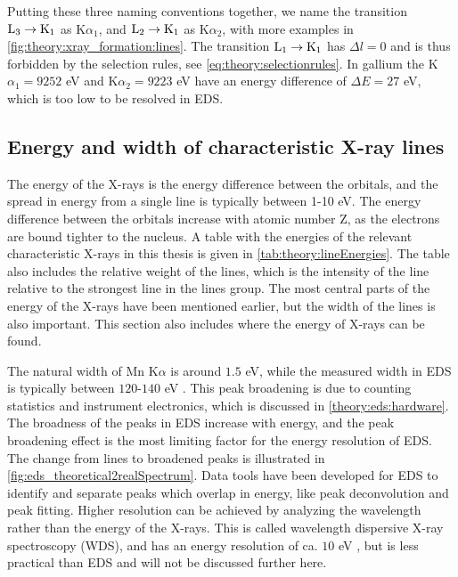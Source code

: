 Putting these three naming conventions together, we name the transition $\textnormal{L}_3 \rightarrow \textnormal{K}_1$ as K$\alpha_1$, and $\textnormal{L}_2 \rightarrow \textnormal{K}_1$ as K$\alpha_2$, with more examples in \cref{fig:theory:xray_formation:lines}.
The transition $\textnormal{L}_1 \rightarrow \textnormal{K}_1$ has $\Delta l =  0$ and is thus forbidden by the selection rules, see \cref{eq:theory:selectionrules}.
In gallium the K$\alpha_1 = 9252$ eV and K$\alpha_2 = 9223$ eV \cite{thompson_x-ray_2004} have an energy difference of $\Delta E = 27$ eV, which is too low to be resolved in EDS.




\subsection{Energy and width of characteristic X-ray lines}
\label{theory:xray_formation:energy}


The energy of the X-rays is the energy difference between the orbitals, and the spread in energy from a single line is typically between 1-10 eV.
The energy difference between the orbitals increase with atomic number Z, as the electrons are bound tighter to the nucleus.
A table with the energies of the relevant characteristic X-rays in this thesis is given in \cref{tab:theory:lineEnergies}.
The table also includes the relative weight of the lines, which is the intensity of the line relative to the strongest line in the lines group.
The most central parts of the energy of the X-rays have been mentioned earlier, but the width of the lines is also important.
This section also includes where the energy of X-rays can be found.


The natural width of Mn K$\alpha$ is around $1.5$ eV, while the measured width in EDS is typically between $120$-$140$ eV \cite[Ch. 16.1.1]{goldstein_scanning_2018}.
This peak broadening is due to counting statistics and instrument electronics, which is discussed in \cref{theory:eds:hardware}.
The broadness of the peaks in EDS increase with energy, and the peak broadening effect is the most limiting factor for the energy resolution of EDS.
The change from lines to broadened peaks is illustrated in \cref{fig:eds_theoretical2realSpectrum}.
Data tools have been developed for EDS to identify and separate peaks which overlap in energy, like peak deconvolution and peak fitting.
Higher resolution can be achieved by analyzing the wavelength rather than the energy of the X-rays.
This is called wavelength dispersive X-ray spectroscopy (WDS), and has an energy resolution of ca. $10$ eV \cite{goldstein_scanning_2018}, but is less practical than EDS and will not be discussed further here.


